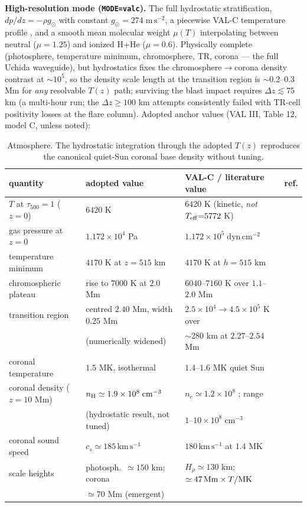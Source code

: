 \documentclass[11pt,a4paper]{article}
\newcommand{\kms}{\,\mathrm{km\,s^{-1}}}
\begin{document}
\textbf{High-resolution mode (\texttt{MODE=valc}).} The full hydrostatic stratification,
$dp/dz=-\rho g_\odot$ with constant $g_\odot=274\;\mathrm{m\,s^{-2}}$, a piecewise
VAL-C temperature profile \cite{VAL1981}, and a smooth mean molecular weight $\mu(T)$
interpolating between neutral ($\mu=1.25$) and ionized H+He ($\mu=0.6$). Physically
complete (photosphere, temperature minimum, chromosphere, TR, corona --- the full Uchida
waveguide), but hydrostatics fixes the chromosphere$\to$corona density contrast at
$\sim$$10^{5}$, so the density scale length at the transition region is
$\sim$0.2--0.3 Mm for \emph{any} resolvable $T(z)$ path; surviving the blast impact
requires $\Delta z\lesssim75$ km (a multi-hour run; the $\Delta z\ge100$ km attempts
consistently failed with TR-cell positivity losses at the flare column). Adopted anchor
values (VAL III, Table 12, model C, unless noted):

\begin{table}[h]\centering\small
\begin{tabular}{llll}
\toprule
quantity & adopted value & VAL-C / literature value & ref.\\
\midrule
$T$ at $\tau_{500}{=}1$ ($z{=}0$) & $6420$ K & $6420$ K (kinetic, \emph{not} $T_{\rm eff}{=}5772$ K) & \cite{VAL1981,Prsa2016}\\
gas pressure at $z{=}0$ & $1.172\times10^{4}$ Pa & $1.172\times10^{5}\;\mathrm{dyn\,cm^{-2}}$ & \cite{VAL1981}\\
temperature minimum & $4170$ K at $z{=}515$ km & $4170$ K at $h{=}515$ km & \cite{VAL1981}\\
chromospheric plateau & rise to $7000$ K at $2.0$ Mm & $6040$--$7160$ K over $1.1$--$2.0$ Mm & \cite{VAL1981}\\
transition region & centred $2.40$ Mm, width $0.25$ Mm & $2.5\times10^4\to4.5\times10^5$ K over & \cite{VAL1981}\\
 & (numerically widened) & $\sim$280 km at $2.27$--$2.54$ Mm & \\
coronal temperature & $1.5$ MK, isothermal & $1.4$--$1.6$ MK quiet Sun & \cite{WarmuthMann2005,Krause2015}\\
coronal density ($z{=}10$ Mm) & $n_{\rm H}\simeq1.9\times10^{8}\;\mathrm{cm^{-3}}$ & $n_e\simeq1.2\times10^{8}$ \cite{Krause2015}; range & \cite{Krause2015,Warmuth2015}\\
 & (hydrostatic result, not tuned) & $1$--$10\times10^{8}\;\mathrm{cm^{-3}}$ & \\
coronal sound speed & $c_s\simeq185\kms$ & $180\kms$ at $1.4$ MK & \cite{WarmuthMann2005}\\
scale heights & photosph.\ $\simeq150$ km; corona & $H_\rho\simeq130$ km; $\simeq47\,{\rm Mm}\times T/{\rm MK}$ & \cite{VAL1981,Aschwanden2005}\\
 & $\simeq70$ Mm (emergent) & & \\
\bottomrule
\end{tabular}
\caption{Atmosphere. The hydrostatic integration through the adopted $T(z)$ reproduces
the canonical quiet-Sun coronal base density without tuning.}
\end{table}
\end{document}
